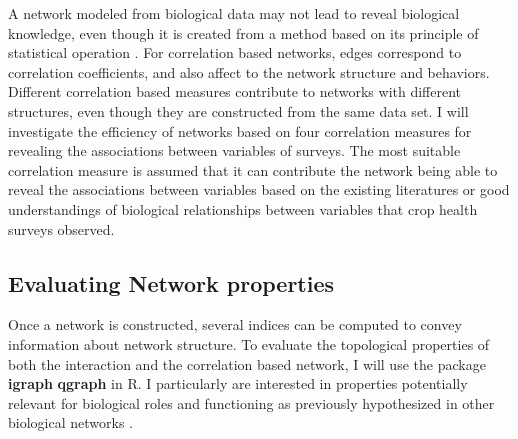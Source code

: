 A network modeled from biological data may not lead to reveal biological knowledge, even though it is created from a method based on its principle of statistical operation . For correlation based networks, edges correspond to correlation coefficients, and also affect to the network structure and behaviors. Different correlation based measures contribute to networks with different structures, even though they are constructed from the same data set. I will investigate the efficiency of networks based on four correlation measures for revealing the associations between variables of surveys. The most suitable correlation measure is assumed that it can contribute the network being able to reveal the associations between variables based on the existing literatures or good understandings of biological relationships between variables that crop health surveys observed.


\subsection*{Evaluating Network properties}

Once a network is constructed, several indices can be computed to convey information about network structure. To evaluate the topological properties of both the interaction and the correlation based network, I will use the package \textbf{igraph}  \textbf{qgraph}  in R. I particularly are interested in properties potentially relevant for biological roles and functioning as previously hypothesized in other biological networks .

